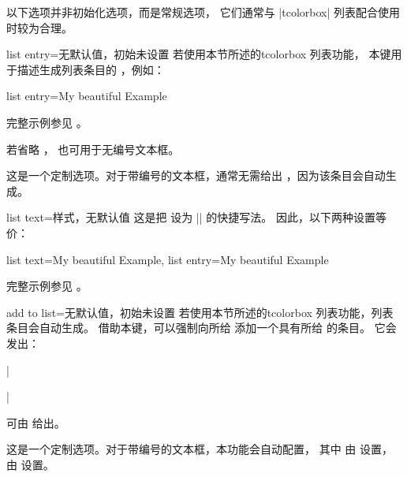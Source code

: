 \clearpage

\begin{marker}
以下选项并非初始化选项，而是常规选项，
它们通常与 |tcolorbox| 列表配合使用时较为合理。
\end{marker}

\begin{docTcbKey}{list entry}{=}{无默认值，初始未设置}
  若使用本节所述的\flqq tcolorbox 列表\frqq 功能，
  本键用于描述生成列表条目的 ，例如：
\begin{dispListing}
list entry={\protect\numberline{\thetcbcounter}My beautiful Example}
\end{dispListing}
完整示例参见 。\par
若省略 ， 也可用于无编号文本框。
\begin{marker}
这是一个定制选项。对于带编号的文本框，通常无需给出
，因为该条目会自动生成。
\end{marker}
\end{docTcbKey}

\begin{docTcbKey}[][doc new=2014-09-19]{list text}{=}{样式，无默认值}
  这是把  设为
  |\protect\numberline{\thetcbcounter}| 的快捷写法。
  因此，以下两种设置等价：
\begin{dispListing}
list text={My beautiful Example},
list entry={\protect\numberline{\thetcbcounter}My beautiful Example}
\end{dispListing}
完整示例参见 。
\end{docTcbKey}

\begin{docTcbKey}{add to list}{=}{无默认值，初始未设置}
  若使用本节所述的\flqq tcolorbox 列表\frqq 功能，列表条目会自动生成。
  借助本键，可以强制向所给  添加一个具有所给  的条目。
  它会发出：\par
  |\addcontentsline|\par
  可由  给出。
\begin{marker}
这是一个定制选项。对于带编号的文本框，本功能会自动配置，
其中 由  设置，
由  设置。
\end{marker}
\end{docTcbKey}

